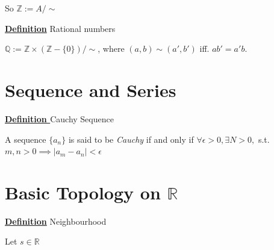 \documentclass[a4paper, 12pt]{article}
\begin{document}
So $\mathbb{Z}:= A \slash \sim$

\vspace{5mm}
\textbf{\underline{Definition}} Rational numbers

$\mathbb{Q}:= \mathbb{Z}\times (\mathbb{Z} - \{0\})\slash\sim$, where 
$(a, b)\sim (a', b')$ iff. $ab' = a'b$.

\section{Sequence and Series}

\textbf{\underline{Definition }} Cauchy Sequence

A sequence $\{a_n\}$ is said to be \textit{Cauchy} if and only if 
$\forall\epsilon > 0, \exists N > 0 ,$ s.t. 
$m, n > 0 \implies |a_m - a_n| < \epsilon$

\section{Basic Topology on $\mathbb{R}$}
\textbf{\underline{Definition}} Neighbourhood

Let $s\in\mathbb{R}$
\end{document}
